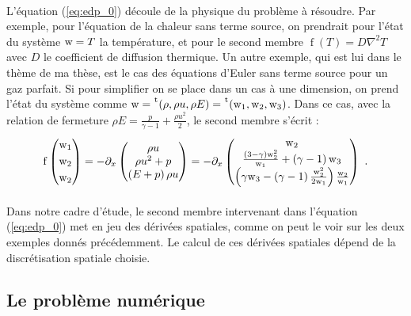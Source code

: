 		\paragraph{}
		L'équation (\ref{eq:edp_0}) découle de la physique du problème à résoudre.
		Par exemple, pour l'équation de la chaleur sans terme source, on prendrait pour l'état du système $\textup{w} = T$ la température, et pour le second membre $\operatorname{f}\left(T\right) = D\nabla^2T$ avec $D$ le coefficient de diffusion thermique.
		Un autre exemple, qui est lui dans le thème de ma thèse, est le cas des équations d'Euler sans terme source pour un gaz parfait.
		Si pour simplifier on se place dans un cas à une dimension, on prend l'état du système comme $\textup{w} = \mskip1mu\prescript{\smash{\mathrm t\mkern-3mu}}{}{\mathstrut\left(\rho, \rho u, \rho E\right)} = \mskip1mu\prescript{\smash{\mathrm t\mkern-3mu}}{}{\mathstrut\left(\textup{w}_1, \textup{w}_2, \textup{w}_3\right)}$.
		Dans ce cas, avec la relation de fermeture $\rho E = \frac{p}{\gamma - 1} + \frac{\rho u^2}{2}$, le second membre s'écrit :
		\[\operatorname{f}\left(\begin{aligned}\textup{w}_1\\\textup{w}_2\\\textup{w}_2\end{aligned}\right)
			= -\partial_x\begin{pmatrix}
				\rho u\\
				\rho u^2 + p\\
				\left(E + p\right)\rho u
				\end{pmatrix}
			= -\partial_x\begin{pmatrix}
				\textup{w}_2\\
				\frac{\left(3 - \gamma\right)\textup{w}_2^2}{\textup{w}_1} + \left(\gamma - 1\right)\textup{w}_3\\
				\left(\gamma\textup{w}_3 - \left(\gamma - 1\right)\frac{\textup{w}_2^2}{2\textup{w}_1}\right)\frac{\textup{w}_2}{\textup{w}_1}
			\end{pmatrix}
		\ .\]

		\paragraph{}
		Dans notre cadre d'étude, le second membre intervenant dans l'équation (\ref{eq:edp_0}) met en jeu des dérivées spatiales, comme on peut le voir sur les deux exemples donnés précédemment.
		Le calcul de ces dérivées spatiales dépend de la discrétisation spatiale choisie.


	\subsection{Le problème numérique}

